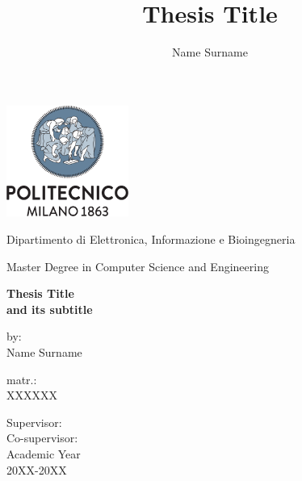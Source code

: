 \documentclass[b5paper, oneside]{book}
\author{Name Surname}
\title{Thesis Title}
\begin{document}
	\centering
	\includegraphics[width=4cm]{../pictures/logo_archetype_vertical}
	
	\vspace{.25cm}
	Dipartimento di Elettronica, Informazione e Bioingegneria
	
	\vspace{0.25cm}
	Master Degree in Computer Science and Engineering
	
	\vspace{1cm}
	\centering
	
	\color{BrickRed}
	\Huge
	\textbf{
		Thesis Title \\%
		\Large and its subtitle}
	
	\normalsize
	\vspace{2cm}
	\color{black}
	\flushright
	by:\\Name Surname
	
	\vspace{0.5cm}
	matr.:\\XXXXXX
	
	\vspace{0.5cm}
	\flushleft
	Supervisor:\\
	
	\vspace{0.5cm}
	Co-supervisor:\\
	
	
	
	\vfill
	\centering
	Academic Year \\ 20XX-20XX
	
\end{document}
